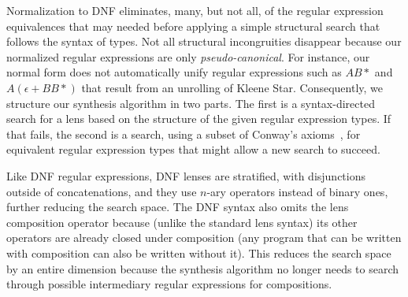 \documentclass[numbers,10pt,preprint\ifanon ,nocopyrightspace\fi]{sigplanconf}
\begin{document}
Normalization to DNF eliminates, many, but not all, of the regular expression
equivalences that may needed before applying a simple structural search that
follows the syntax of types.
Not all structural incongruities disappear because our normalized
regular expressions are only \emph{pseudo-canonical}.
For instance, our normal form
does not automatically unify regular expressions such as
$A B*$ and $A (\epsilon + BB*)$ that result from an
unrolling of Kleene Star.  
Consequently, we structure our synthesis algorithm in two parts.  The
first is a syntax-directed search for a lens based on the structure of the given
regular expression types. If that fails, the second is a search,
using a subset of Conway's axioms~\cite{conway}, for 
equivalent regular expression types that might allow a new search to succeed.

Like DNF regular expressions, DNF lenses are stratified, with disjunctions
outside of concatenations, and they use $n$-ary operators instead of binary
ones, further reducing the search space.  The DNF syntax also omits the lens
composition operator because (unlike the standard lens syntax) its other
operators are already closed under composition (any program that can be
written with composition can also be written without it).  This reduces the
search space by an entire dimension because the synthesis algorithm no
longer needs to search through possible intermediary regular expressions for
compositions.
\end{document}
